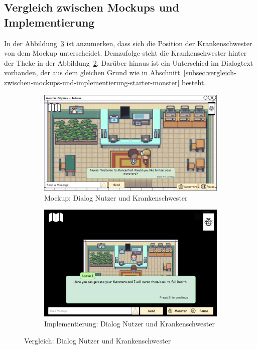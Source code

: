 \subsection{Vergleich zwischen Mockups und Implementierung}\label{subsec:vergleich-zwischen-mockups-und-implementierung-monster-heilen}
In der Abbildung~\ref{fig: Vergleich: Dialog zwischen Nutzer und Krankenschwester} ist anzumerken, dass sich die Position der Krankenschwester von dem Mockup unterscheidet. Demzufolge steht die Krankenschwester hinter der Theke in der Abbildung~\ref{fig: Implementierung: Dialog zwischen Nutzer und Krankenschwester}. Darüber hinaus ist ein Unterschied im Dialogtext vorhanden, der aus dem gleichen Grund wie in Abschnitt~\ref{subsec:vergleich-zwischen-mockups-und-implementierung-starter-monster} besteht.
\begin{figure}[H]
    \centering
    \begin{subfigure}[b]{0.4\textwidth}
        \includegraphics[width=\textwidth]{images/mockups/Heilung/PlayerInMoncenterHealingDialog.png}
        \caption{Mockup: Dialog Nutzer und Krankenschwester}
        \label{fig: Mockup: Dialog zwischen Nutzer und Krankenschwester}
    \end{subfigure}
    \hfill
    \begin{subfigure}[b]{0.4\textwidth}
        \includegraphics[width=\textwidth]{images/implementation/Heilung/DialogNurseImp.png}
        \caption{Implementierung: Dialog Nutzer und Krankenschwester}
        \label{fig: Implementierung: Dialog zwischen Nutzer und Krankenschwester}
    \end{subfigure}
    \caption{Vergleich: Dialog Nutzer und Krankenschwester}
    \label{fig: Vergleich: Dialog zwischen Nutzer und Krankenschwester}
\end{figure}
